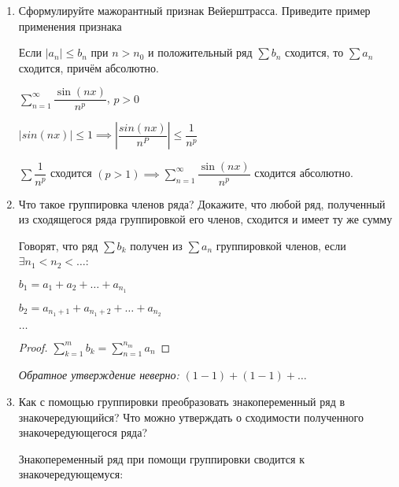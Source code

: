 \documentclass[a4paper]{article}
\begin{document}
\begin{enumerate}
        \item Сформулируйте мажорантный признак Вейерштрасса. Приведите пример применения признака
        
        \begin{theorem}
            Если $|a_n| \leq b_n$ при $n > n_0$ и положительный ряд $\sum b_n$ сходится,
            то $\sum a_n$ сходится, причём абсолютно.
        \end{theorem}
        
        \begin{example}
        $\sum_{n=1}^{\infty} \dfrac{\sin(nx)}{n^p}$, $p > 0$
        
        $|sin(nx)| \leq 1 \implies \left|\dfrac{sin(nx)}{n^P}\right| \leq \dfrac{1}{n^p}$
        
        $\sum \dfrac{1}{n^p} $ сходится $(p > 1) \implies \sum_{n=1}^{\infty} \dfrac{\sin(nx)}{n^p}$ сходится абсолютно.
        \end{example}

        \item Что такое группировка членов ряда? Докажите, что любой ряд, полученный из сходящегося ряда группировкой его членов, сходится и имеет ту же сумму
        
        Говорят, что ряд $\sum b_k$ получен из $\sum a_n$ группировкой членов, если $\exists n_1 < n_2 < \dots$:

        $b_1 = a_1 + a_2 + \dots + a_{n_1}$

        $b_2 = a_{n_1 + 1} + a_{n_1 + 2} + \dots + a_{n_2}$

        $\dots$

        \begin{comment}
            Если $\sum a_n$ сходится, то ряд $\sum b_k$ сходится к той же сумме.
        \end{comment}

        \begin{proof}
        $\sum_{k=1}^{m} b_k = \sum_{n=1}^{n_m} a_n$
        \end{proof}

        \textit{Обратное утверждение неверно:} $(1 - 1) + (1 - 1) + \dots$

        \item Как с помощью группировки преобразовать знакопеременный ряд в знакочередующийся? Что можно утверждать о сходимости полученного знакочередующегося ряда?
        
        Знакопеременный ряд при помощи группировки сводится к знакочередующемуся:


\end{enumerate}
\end{document}
